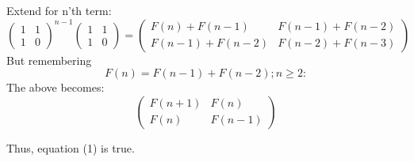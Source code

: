 \documentclass[11pt, a4paper]{article}
\begin{document}
 Extend for n'th term:
\[ \begin{pmatrix}
          1 & 1 \\
          1 & 0
        \end{pmatrix}^{n-1}
        \begin{pmatrix}
          1 & 1 \\
          1 & 0
        \end{pmatrix} =
        \begin{pmatrix}
          F(n) + F(n-1) & F(n-1) + F(n-2) \\
          F(n-1) + F(n-2) & F(n-2) + F(n-3) 
      \end{pmatrix} \]
      But remembering \[ F(n) = F(n-1) + F(n-2); n \ge 2: \]
      The above becomes:
        \[ \begin{pmatrix}
            F(n+1) & F(n) \\
            F(n) & F(n-1)
        \end{pmatrix} 
      \]

      Thus, equation (1) is true.
\end{document}
